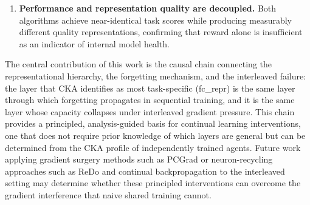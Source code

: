 \documentclass[a4paper]{article}
\begin{document}
\begin{enumerate}
    \item \textbf{Performance and representation quality are decoupled.} Both algorithms
    achieve near-identical task scores while producing measurably different quality
    representations, confirming that reward alone is insufficient as an indicator of internal
    model health.
\end{enumerate}

The central contribution of this work is the causal chain connecting the representational
hierarchy, the forgetting mechanism, and the interleaved failure: the layer that CKA
identifies as most task-specific (fc\_repr) is the same layer through which forgetting
propagates in sequential training, and it is the same layer whose capacity collapses under
interleaved gradient pressure. This chain provides a principled, analysis-guided basis for
continual learning interventions, one that does not require prior knowledge of which layers
are general but can be determined from the CKA profile of independently trained agents.
Future work applying gradient surgery methods such as PCGrad \cite{yu2020pcgrad} or
neuron-recycling approaches such as ReDo \cite{sokar2023dormant} and continual backpropagation
\cite{elsayed2024continual,dohare2024loss} to the interleaved setting may determine whether
these principled interventions can overcome the gradient interference that naive shared
training cannot.
\end{document}
